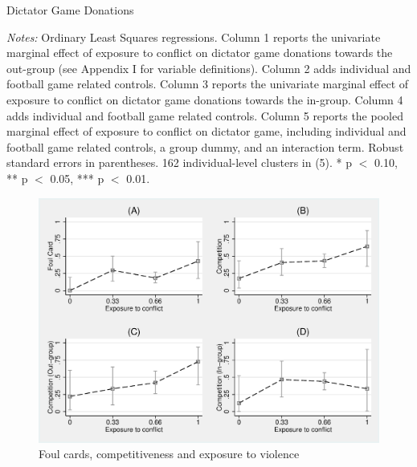 \documentclass[10pt,a4paper]{scrartcl} %
\begin{document}
\begin{table}[p!]
\centering
\begin{threeparttable}
  \caption{Dictator Game Donations}
  \label{tab:slf:dictator}
  \singlespacing
  \small
  
  \begin{tablenotes}
    \footnotesize
    \item \textit{Notes:} Ordinary Least Squares regressions. Column 1 reports the univariate marginal effect of exposure to conflict on dictator game donations towards the out-group (see Appendix I for variable definitions). Column 2 adds individual and football game related controls. Column 3 reports the univariate marginal effect of exposure to conflict on dictator game donations towards the in-group. Column 4 adds individual and football game related controls. Column 5 reports the pooled marginal effect of exposure to conflict on dictator game, including individual and football game related controls, a group dummy, and an interaction term. Robust standard errors in parentheses. 162 individual-level clusters in (5). * p $<$ 0.10, ** p $<$ 0.05, *** p $<$ 0.01.
    \item
  \end{tablenotes}
\end{threeparttable}
\end{table}
\begin{figure}
  \begin{center}
  \includegraphics[width=0.8\linewidth]{"Outputs_anon/figures/f4_we_competition.eps"}
  \caption{Foul cards, competitiveness and exposure to violence}
  \label{fig:slf:we_competition}
  \end{center}
\end{figure}
\end{document}
